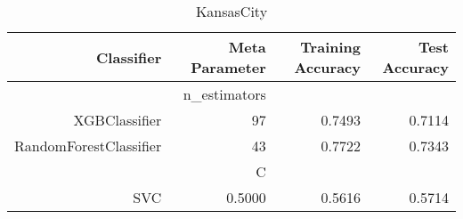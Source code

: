 
\begin{table}[H]
    \caption{KansasCity}
    \centering
    \begin{tabular}{|r|r|r|r|}
        \hline
        Classifier &Meta Parameter &Training Accuracy
        &Test Accuracy\\
        \hline
        &n\_estimators &\multicolumn{2}{|r|}{}\\
        \hline
        XGBClassifier &97 &0.7493 &0.7114\\
        \hline
        RandomForestClassifier &43 &0.7722 &0.7343\\
        \hline
        &C &\multicolumn{2}{|r|}{}\\
        \hline
        SVC &0.5000 &0.5616 &0.5714\\
        \hline
    \end{tabular}
\end{table}
